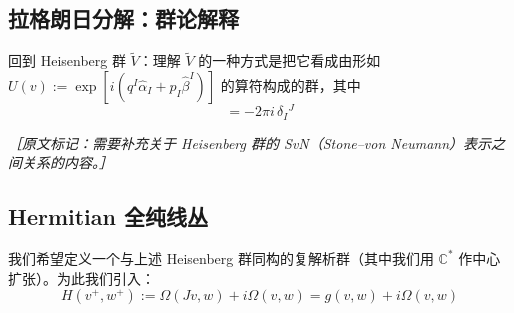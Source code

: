 
\subsection{拉格朗日分解：群论解释} %

回到 Heisenberg 群 $\tilde V$：理解 $\tilde V$ 的一种方式是把它看成由形如
$U(v) := \exp[i(q^I\hat\alpha_I + p_I\hat\beta^I)]$ 的算符构成的群，其中
\begin{equation}
  [\hat\alpha_I, \hat\beta^J] = -2\pi i\,\delta_I{}^J
  \tag{E.46}
  \label{eq:E.46}
\end{equation}


{\small\itshape ［原文标记：需要补充关于 Heisenberg 群的 SvN（Stone--von Neumann）表示之间关系的内容。］}

\subsection{Hermitian 全纯线丛} %

我们希望定义一个与上述 Heisenberg 群同构的复解析群（其中我们用 $\mathbb{C}^*$ 作中心扩张）。为此我们引入：
\begin{equation}
  H(v^+,w^+) := \Omega(Jv,w) + i\Omega(v,w) = g(v,w) + i\Omega(v,w)
  \tag{E.47}
  \label{eq:E.47}
\end{equation}

